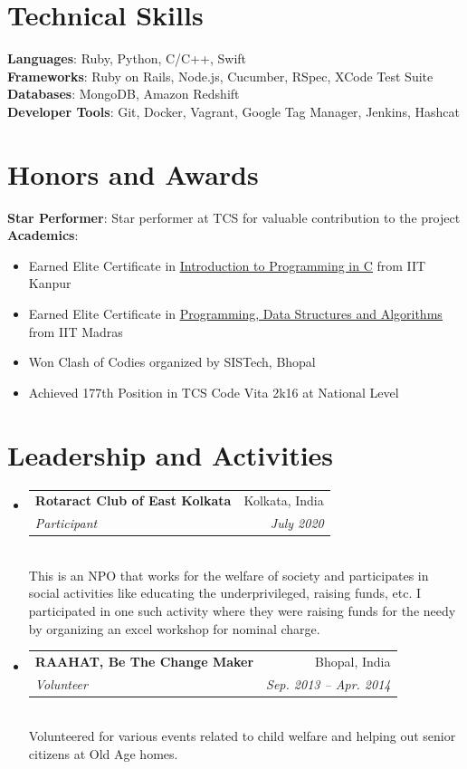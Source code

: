 \documentclass[letterpaper,11pt]{article}
\makeatletter
\newcommand{\resumeItem}[1]{
  \item\small{
    {#1 \vspace{-2pt}}
  }
}
\newcommand{\resumeSubheading}[4]{
  \vspace{-2pt}\item
    \begin{tabular*}{0.97\textwidth}[t]{l@{\extracolsep{\fill}}r}
      \textbf{#1} & #2 \\
      \textit{\small#3} & \textit{\small #4} \\
    \end{tabular*}\vspace{-7pt}
}
\newcommand{\resumeSubHeadingListStart}{\begin{itemize}[leftmargin=0.15in, label={}]}
\newcommand{\resumeSubHeadingListEnd}{\end{itemize}}
\newcommand{\resumeItemListStart}{\begin{itemize}}
\newcommand{\resumeItemListEnd}{\end{itemize}\vspace{-5pt}}
\makeatother
\begin{document}
\section{Technical Skills}
 \begin{itemize}[leftmargin=0.15in, label={}]
    \small{\item{
     \textbf{Languages}{: Ruby, Python, C/C++, Swift } \\
     \textbf{Frameworks}{: Ruby on Rails, Node.js, Cucumber, RSpec, XCode Test Suite } \\
     \textbf{Databases}{: MongoDB, Amazon Redshift } \\
     \textbf{Developer Tools}{: Git, Docker, Vagrant, Google Tag Manager, Jenkins, Hashcat } \\
    }}
 \end{itemize}

\section{Honors and Awards}
\begin{itemize}[leftmargin=0.15in, label={}]
   \small{\item{
    \textbf{Star Performer}{: Star performer at TCS for valuable contribution to the project} \\
    \textbf{Academics}{:} 
    \resumeItemListStart
       \resumeItem {Earned Elite Certificate in \href{https://nptel.ac.in/noc/Ecertificate/?q=noc15-cs15/NPTEL15CS150614020.jpg}{\underline{Introduction to Programming in C}} from IIT Kanpur}
       \resumeItem {Earned Elite Certificate in \href{https://nptel.ac.in/noc/Ecertificate/?q=linkedin/noc16-cs06/NPTEL16CS062715051.jpg}{\underline{Programming, Data Structures and Algorithms}} from IIT Madras}
       \resumeItem {Won Clash of Codies organized by SISTech, Bhopal}
       \resumeItem {Achieved 177th Position in TCS Code Vita 2k16 at National Level}
    \resumeItemListEnd
   }}
\end{itemize}

\section{Leadership and Activities}
 \resumeSubHeadingListStart
  \resumeSubheading
     {Rotaract Club of East Kolkata}{Kolkata, India}
     {Participant}{July 2020} \vspace{2px} \\
     {This is an NPO that works for the welfare of society and participates in social activities like educating the underprivileged, raising funds, etc. I participated in one such activity where they were raising funds for the needy by organizing an excel workshop for nominal charge.}
  \resumeSubheading
     {RAAHAT, Be The Change Maker}{Bhopal, India}
     {Volunteer}{Sep. 2013 -- Apr. 2014} \vspace{2px} \\
     {Volunteered for various events related to child welfare and helping out senior citizens at Old Age homes.}
 \resumeSubHeadingListEnd
\end{document}
